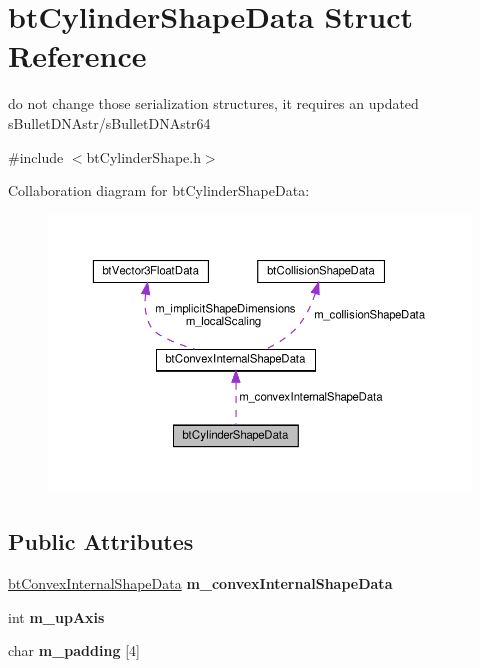 \hypertarget{structbtCylinderShapeData}{}\section{bt\+Cylinder\+Shape\+Data Struct Reference}
\label{structbtCylinderShapeData}


do not change those serialization structures, it requires an updated s\+Bullet\+D\+N\+Astr/s\+Bullet\+D\+N\+Astr64  




{\ttfamily \#include $<$bt\+Cylinder\+Shape.\+h$>$}



Collaboration diagram for bt\+Cylinder\+Shape\+Data\+:
\nopagebreak
\begin{figure}[H]
\begin{center}
\leavevmode
\includegraphics[width=350pt]{structbtCylinderShapeData__coll__graph}
\end{center}
\end{figure}
\subsection*{Public Attributes}
\begin{DoxyCompactItemize}
\item 
\mbox{\label{structbtCylinderShapeData_a28c7c43a31f7765ab3e3003957030161}} 
\hyperlink{structbtConvexInternalShapeData}{bt\+Convex\+Internal\+Shape\+Data} {\bfseries m\+\_\+convex\+Internal\+Shape\+Data}
\item 
\mbox{\label{structbtCylinderShapeData_a9dcfe1386ff3853ae29c67c44178a2ac}} 
int {\bfseries m\+\_\+up\+Axis}
\item 
\mbox{\label{structbtCylinderShapeData_a8a1966f3a89ce092e842a959ea800ebb}} 
char {\bfseries m\+\_\+padding} \mbox{[}4\mbox{]}
\end{DoxyCompactItemize}


